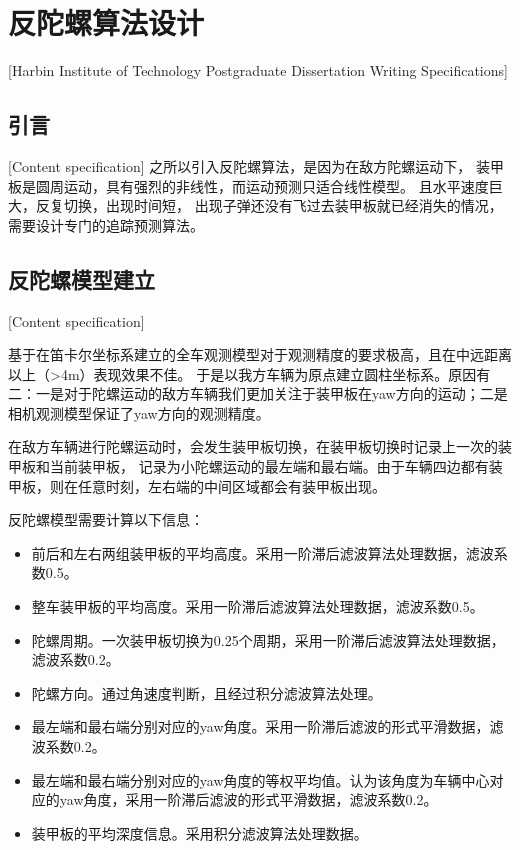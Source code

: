 

\chapter[反陀螺算法设计]{反陀螺算法设计}[Harbin Institute of Technology Postgraduate Dissertation Writing Specifications]

\section{引言}[Content specification]
之所以引入反陀螺算法，是因为在敌方陀螺运动下，
装甲板是圆周运动，具有强烈的非线性，而运动预测只适合线性模型。
且水平速度巨大，反复切换，出现时间短，
出现子弹还没有飞过去装甲板就已经消失的情况，需要设计专门的追踪预测算法。


\section{反陀螺模型建立}[Content specification]

基于在笛卡尔坐标系建立的全车观测模型对于观测精度的要求极高，且在中远距离以上（>4m）表现效果不佳。
于是以我方车辆为原点建立圆柱坐标系。原因有二：一是对于陀螺运动的敌方车辆我们更加关注于装甲板在yaw方向的运动；二是相机观测模型保证了yaw方向的观测精度。


在敌方车辆进行陀螺运动时，会发生装甲板切换，在装甲板切换时记录上一次的装甲板和当前装甲板，
记录为小陀螺运动的最左端和最右端。由于车辆四边都有装甲板，则在任意时刻，左右端的中间区域都会有装甲板出现。

反陀螺模型需要计算以下信息：
\begin{itemize}[itemindent=2em]
    \item 前后和左右两组装甲板的平均高度。采用一阶滞后滤波算法处理数据，滤波系数0.5。
    \item 整车装甲板的平均高度。采用一阶滞后滤波算法处理数据，滤波系数0.5。
    \item 陀螺周期。一次装甲板切换为0.25个周期，采用一阶滞后滤波算法处理数据，滤波系数0.2。
    \item 陀螺方向。通过角速度判断，且经过积分滤波算法处理。
    \item 最左端和最右端分别对应的yaw角度。采用一阶滞后滤波的形式平滑数据，滤波系数0.2。
    \item 最左端和最右端分别对应的yaw角度的等权平均值。认为该角度为车辆中心对应的yaw角度，采用一阶滞后滤波的形式平滑数据，滤波系数0.2。
    \item 装甲板的平均深度信息。采用积分滤波算法处理数据。
\end{itemize}


